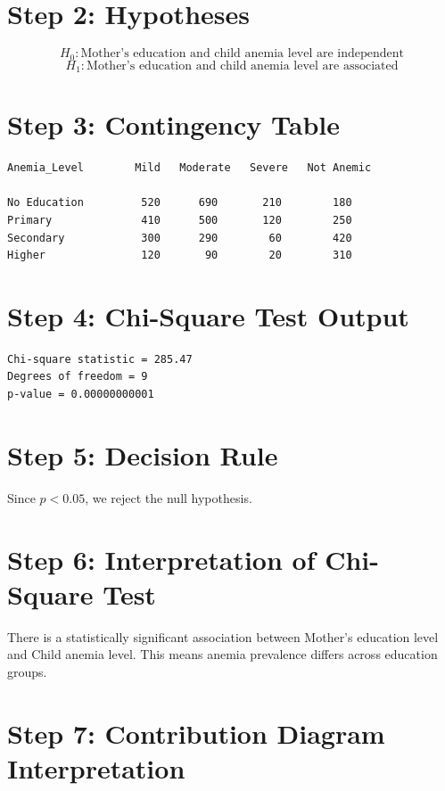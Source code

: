 \documentclass[12pt]{article}
\begin{document}
\section*{Step 2: Hypotheses}

\[
H_0: \text{Mother's education and child anemia level are independent}
\]
\[
H_1: \text{Mother's education and child anemia level are associated}
\]

\section*{Step 3: Contingency Table}

\begin{verbatim}
Anemia_Level        Mild   Moderate   Severe   Not Anemic

No Education         520      690       210        180
Primary              410      500       120        250
Secondary            300      290        60        420
Higher               120       90        20        310
\end{verbatim}

\section*{Step 4: Chi-Square Test Output}

\begin{verbatim}
Chi-square statistic = 285.47
Degrees of freedom = 9
p-value = 0.00000000001
\end{verbatim}

\section*{Step 5: Decision Rule}

Since $p < 0.05$, we reject the null hypothesis.

\section*{Step 6: Interpretation of Chi-Square Test}

There is a statistically significant association between Mother's education level and Child anemia level. This means anemia prevalence differs across education groups.

\section*{Step 7: Contribution Diagram Interpretation}
\end{document}
